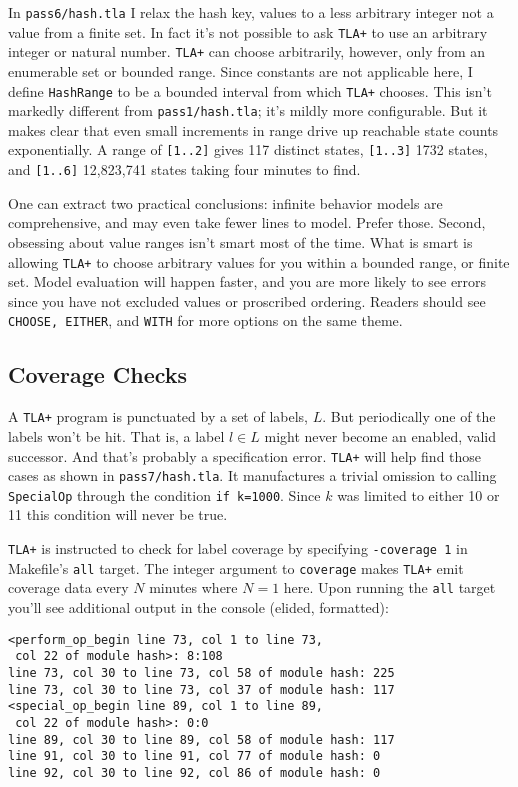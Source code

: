 \documentclass[twocolumn]{article}
\begin{document}
In \texttt{pass6/hash.tla} I relax the hash key, values to a less arbitrary integer not a value from a finite set. In fact it's not possible to ask \texttt{TLA+} to use an arbitrary integer or natural number. \texttt{TLA+} can choose arbitrarily, however, only from an enumerable set or bounded range. Since constants are not applicable here, I define \texttt{HashRange} to be a bounded interval from which \texttt{TLA+} chooses. This isn't markedly different from \texttt{pass1/hash.tla}; it's mildly more configurable. But it makes clear that even small increments in range drive up reachable state counts exponentially. A range of \texttt{[1..2]} gives 117 distinct states, \texttt{[1..3]} 1732 states, and \texttt{[1..6]} 12,823,741 states taking four minutes to find.

One can extract two practical conclusions: infinite behavior models are comprehensive, and may even take fewer lines to model. Prefer those. Second, obsessing about value ranges isn't smart most of the time. What is smart is allowing \texttt{TLA+} to choose arbitrary values for you within a bounded range, or finite set. Model evaluation will happen faster, and you are more likely to see errors since you have not excluded values or proscribed ordering. Readers should see \texttt{CHOOSE, EITHER}, and \texttt{WITH} for more options on the same theme.

\subsection{Coverage Checks}
A \texttt{TLA+} program is punctuated by a set of labels, $L$. But periodically one of the labels won't be hit. That is, a label $l \in L$ might never become an enabled, valid successor. And that's probably a specification error. \texttt{TLA+} will help find those cases as shown in \texttt{pass7/hash.tla}. It manufactures a trivial omission to calling \texttt{SpecialOp} through the condition \texttt{if k=1000}. Since $k$ was limited to either 10 or 11 this condition will never be true. 

\texttt{TLA+} is instructed to check for label coverage by specifying \texttt{-coverage 1} in Makefile's \texttt{all} target. The integer argument to \texttt{coverage} makes \texttt{TLA+} emit coverage data every $N$ minutes where $N=1$ here. Upon running the \texttt{all} target you'll see additional output in the console (elided, formatted):

\begin{verbatim}
<perform_op_begin line 73, col 1 to line 73, 
 col 22 of module hash>: 8:108
line 73, col 30 to line 73, col 58 of module hash: 225
line 73, col 30 to line 73, col 37 of module hash: 117
<special_op_begin line 89, col 1 to line 89,
 col 22 of module hash>: 0:0
line 89, col 30 to line 89, col 58 of module hash: 117
line 91, col 30 to line 91, col 77 of module hash: 0
line 92, col 30 to line 92, col 86 of module hash: 0
\end{verbatim}
\end{document}
